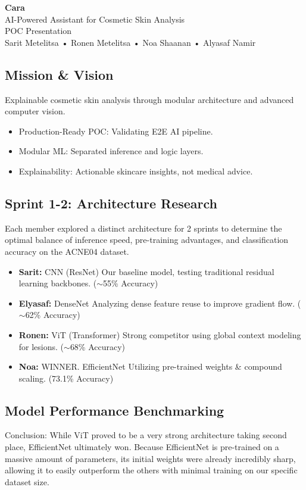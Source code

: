 \documentclass[12pt,a4paper]{article}
\begin{document}
\textbf{Cara}\\
AI-Powered Assistant for Cosmetic Skin Analysis\\
POC Presentation\\
Sarit Metelitsa • Ronen Metelitsa • Noa Shaanan • Alyasaf Namir

\subsection{Mission \& Vision}
Explainable cosmetic skin analysis through modular architecture and advanced computer vision.
\begin{itemize}
    \item Production-Ready POC: Validating E2E AI pipeline.
    \item Modular ML: Separated inference and logic layers.
    \item Explainability: Actionable skincare insights, not medical advice.
\end{itemize}

\subsection{Sprint 1-2: Architecture Research}
Each member explored a distinct architecture for 2 sprints to determine the optimal balance of inference speed, pre-training advantages, and classification accuracy on the ACNE04 dataset.
\begin{itemize}
    \item \textbf{Sarit:} CNN (ResNet) Our baseline model, testing traditional residual learning backbones. ($\sim$55\% Accuracy)
    \item \textbf{Elyasaf:} DenseNet Analyzing dense feature reuse to improve gradient flow. ($\sim$62\% Accuracy)
    \item \textbf{Ronen:} ViT (Transformer) Strong competitor using global context modeling for lesions. ($\sim$68\% Accuracy)
    \item \textbf{Noa:} WINNER. EfficientNet Utilizing pre-trained weights \& compound scaling. (73.1\% Accuracy)
\end{itemize}

\subsection{Model Performance Benchmarking}
Conclusion: While ViT proved to be a very strong architecture taking second place, EfficientNet ultimately won. Because EfficientNet is pre-trained on a massive amount of parameters, its initial weights were already incredibly sharp, allowing it to easily outperform the others with minimal training on our specific dataset size.
\end{document}
